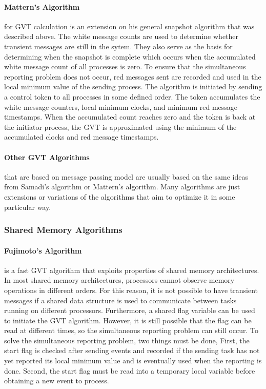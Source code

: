 \documentclass[11pt]{book}
\begin{document}
\paragraph{Mattern's Algorithm}\cite{mattern-93} for GVT calculation is an extension on his
general snapshot algorithm that was described above.  The white message counts are used to
determine whether transient messages are still in the sytem.  They also serve as the basis
for determining when the snapshot is complete which occurs when the accumulated white message
count of all processes is zero.  To ensure that the simultaneous reporting problem does not
occur, red messages sent are recorded and used in the local minimum value of the sending process.
The algorithm is initiated by sending a control token to all processes in some defined order.
The token accumulates the white message counters, local minimum clocks, and minimum red message
timestamps.  When the accumulated count reaches zero and the token is back at the initiator process,
the GVT is approximated using the minimum of the accumulated clocks and red message timestamps.

\paragraph{Other GVT Algorithms} that are based on message passing model are usually based
on the same ideas from Samadi's algorithm or Mattern's algorithm.  Many algorithms are just
extensions or variations of the algorithms that aim to optimize it in some particular way.

\subsubsection{Shared Memory Algorithms}

\paragraph{Fujimoto's Algorithm}\cite{fujimoto-94} is a fast GVT algorithm that exploits
properties of shared memory architectures.  In most shared memory architectures, processors
cannot observe memory operations in different orders.  For this reason, it is not possible
to have transient messages if a shared data structure is used to communicate between tasks
running on different processors.  Furthermore, a shared flag variable can be used to initiate
the GVT algorithm.  However, it is still possible that the flag can be read at different
times, so the simultaneous reporting problem can still occur.  To solve the simultaneous
reporting problem, two things must be done, First, the start flag is checked after sending
events and recorded if the sending task has not yet reported its local minimum value and
is eventually used when the reporting is done.  Second, the start flag must be read into a
temporary local variable before obtaining a new event to process.
\end{document}
